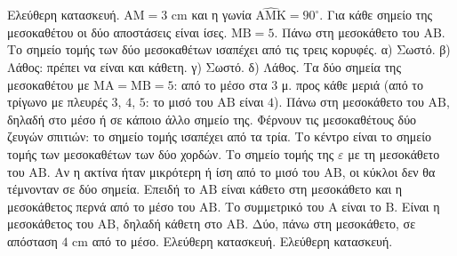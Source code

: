  Ελεύθερη κατασκευή. $\mathrm{ΑΜ}=3$ cm και η γωνία $\widehat{\mathrm{ΑΜΚ}}=90^\circ$.
 Για κάθε σημείο της μεσοκαθέτου οι δύο αποστάσεις είναι ίσες.
 $\mathrm{ΜΒ}=5$.
 Πάνω στη μεσοκάθετο του $\mathrm{ΑΒ}$.
 Το σημείο τομής των δύο μεσοκαθέτων ισαπέχει από τις τρεις κορυφές.
 α) Σωστό. β) Λάθος: πρέπει να είναι και κάθετη. γ) Σωστό. δ) Λάθος.
 Τα δύο σημεία της μεσοκαθέτου με $\mathrm{ΜΑ}=\mathrm{ΜΒ}=5$: από το μέσο στα $3$ μ. προς κάθε μεριά (από το τρίγωνο με πλευρές $3$, $4$, $5$: το μισό του $\mathrm{ΑΒ}$ είναι $4$).
 Πάνω στη μεσοκάθετο του $\mathrm{ΑΒ}$, δηλαδή στο μέσο ή σε κάποιο άλλο σημείο της.
 Φέρνουν τις μεσοκαθέτους δύο ζευγών σπιτιών: το σημείο τομής ισαπέχει από τα τρία.
 Το κέντρο είναι το σημείο τομής των μεσοκαθέτων των δύο χορδών.
 Το σημείο τομής της $\varepsilon$ με τη μεσοκάθετο του $\mathrm{ΑΒ}$.
 Αν η ακτίνα ήταν μικρότερη ή ίση από το μισό του $\mathrm{ΑΒ}$, οι κύκλοι δεν θα τέμνονταν σε δύο σημεία.
 Επειδή το $\mathrm{ΑΒ}$ είναι κάθετο στη μεσοκάθετο και η μεσοκάθετος περνά από το μέσο του $\mathrm{ΑΒ}$. Το συμμετρικό του $\mathrm{Α}$ είναι το $\mathrm{Β}$.
 Είναι η μεσοκάθετος του $\mathrm{ΑΒ}$, δηλαδή κάθετη στο $\mathrm{ΑΒ}$.
 Δύο, πάνω στη μεσοκάθετο, σε απόσταση $4$ cm από το μέσο.
 Ελεύθερη κατασκευή.
 Ελεύθερη κατασκευή.
